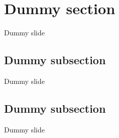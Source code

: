 \documentclass[10pt, aspectratio=169, french]{beamer}
\begin{document}
\section{Dummy section}

\begin{frame}{Dummy slide}
  \centering
  \begin{minipage}{0.9\textwidth}
    \justifying\lipsum[1]
  \end{minipage}
\end{frame}

\subsection{Dummy subsection}

\begin{frame}{Dummy slide}
  \centering
  \begin{minipage}{0.9\textwidth}
    \justifying\lipsum[1]
  \end{minipage}
\end{frame}

\subsection{Dummy subsection}

\begin{frame}{Dummy slide}
  \centering
  \begin{minipage}{0.9\textwidth}
    \justifying\lipsum[1]
  \end{minipage}
\end{frame}



\end{document}
